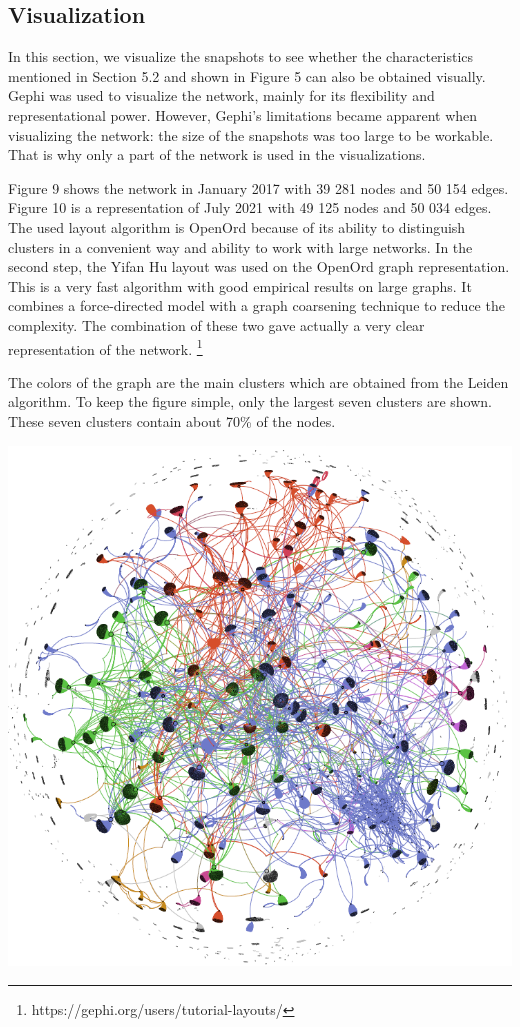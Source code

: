 \documentclass[10pt,a4paper]{article}
\newenvironment{Figure}
  {\par\medskip\noindent\minipage{\linewidth}}
  {\endminipage\par\medskip}
\begin{document}
\begin{multicols}{2}
\section{Visualization} 
In this section, we visualize the snapshots to see whether the characteristics mentioned in Section 5.2 and shown in Figure 5 can also be obtained visually. 
Gephi was used to visualize the network, mainly for its flexibility and representational power. 
However, Gephi's limitations became apparent when visualizing the network: the size of the snapshots was too large to be workable. That is why only a part of the network is used in the visualizations. 

Figure 9 shows the network in January 2017 with 39 281 nodes and 50 154 edges. Figure 10 is a representation of July 2021 with 49 125 nodes and 50 034 edges. The used layout algorithm is OpenOrd \cite{martin2011openord} because of its ability to distinguish clusters in a convenient way and ability to work with large networks. In the second step, the Yifan Hu layout was used on the OpenOrd graph representation. This is a very fast algorithm with good empirical results on large graphs. It combines a force-directed model with a graph coarsening technique to reduce the complexity. The combination of these two gave actually a very clear representation of the network. \footnote{https://gephi.org/users/tutorial-layouts/}

The colors of the graph are the main clusters which are obtained from the Leiden algorithm. To keep the figure simple, only the largest seven clusters are shown. These seven clusters contain about 70\% of the nodes. 

\begin{Figure}
\centering
\includegraphics[scale=0.37]{figures/Jan_17_edges.png}
\label{clusters}
\end{Figure}


\end{multicols}
\end{document}
